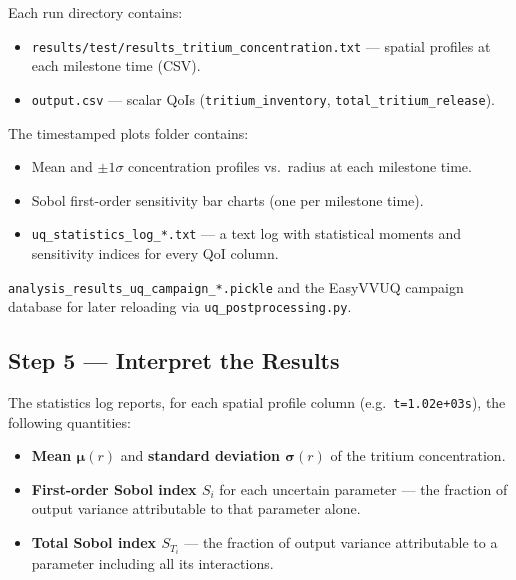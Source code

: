 \documentclass[11pt,a4paper]{article}
\begin{document}
\begin{description}[nosep]
  \item[Per-sample results] Each run directory contains:
    \begin{itemize}[nosep]
      \item \texttt{results/test/results\_tritium\_concentration.txt}
            --- spatial profiles at each milestone time (CSV).
      \item \texttt{output.csv} --- scalar QoIs
            (\texttt{tritium\_inventory}, \texttt{total\_tritium\_release}).
    \end{itemize}

  \item[Aggregated output] The timestamped plots folder contains:
    \begin{itemize}[nosep]
      \item Mean and $\pm 1\sigma$ concentration profiles vs.\ radius
            at each milestone time.
      \item Sobol first-order sensitivity bar charts
            (one per milestone time).
      \item \texttt{uq\_statistics\_log\_*.txt} --- a text log with
            statistical moments and sensitivity indices for every QoI
            column.
    \end{itemize}

  \item[Campaign state]
    \texttt{analysis\_results\_uq\_campaign\_*.pickle} and the EasyVVUQ
    campaign database for later reloading via
    \texttt{uq\_postprocessing.py}.
\end{description}

\subsection{Step 5 --- Interpret the Results}
\label{sec:tut:interpret}

The statistics log reports, for each spatial profile column
(e.g.\ \texttt{t=1.02e+03s}), the following quantities:

\begin{itemize}[nosep]
  \item \textbf{Mean $\boldsymbol{\mu}(r)$} and \textbf{standard deviation
        $\boldsymbol{\sigma}(r)$} of the tritium concentration.
  \item \textbf{First-order Sobol index $S_i$} for each uncertain
        parameter --- the fraction of output variance attributable to
        that parameter alone.
  \item \textbf{Total Sobol index $S_{T_i}$} --- the fraction of output
        variance attributable to a parameter including all its
        interactions.
\end{itemize}
\end{document}
